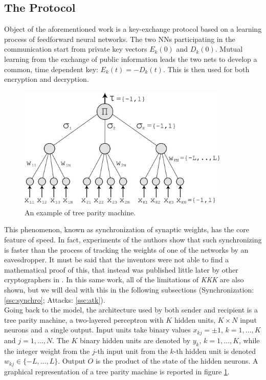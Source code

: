 \documentclass[%
    corpo=11pt,
    twoside,
    stile=classica,
    oldstyle,
    autoretitolo,
    tipotesi=magistrale,
    greek,
    evenboxes,
    english
]{toptesi}
\begin{document}
\subsection{The Protocol}
Object of the aforementioned work is a key-exchange protocol based on a learning process of feedforward neural networks. The two NNs participating in the communication start from private key vectors $E_k(0)$ and $D_k(0)$. Mutual learning from the exchange of public information leads the two nets to develop a common, time dependent key: $E_k(t) = - D_k(t)$. This is then used for both encryption and decryption. \\
\begin{figure}[]
\centering
\includegraphics[width=0.9\textwidth]{pictures/tpm.jpg}
\caption{An example of tree parity machine.}
\label{fig:tpm}
\end{figure}
This phenomenon, known as synchronization of synaptic weights, has the core feature of speed. In fact, experiments of the authors show that such synchronizing is faster than the process of tracking the weights of one of the networks by an eavesdropper. It must be said that the inventors were not able to find a mathematical proof of this, that instead was published little later by other cryptographers in \cite{shamir}. In this same work, all of the limitations of \textit{KKK} are also shown, but we will deal with this in the following subsections (Synchronization: \ref{ssc:synchro}; Attacks: \ref{ssc:atk}).  \\
Going back to the model, the architecture used by both sender and recipient is a tree parity machine, a two-layered perceptron with $K$ hidden units, $K \times N$ input neurons and a single output. Input units take binary values $x_{kj} = \pm 1$, $k = 1,\dots, K$ and $j = 1, \dots, N$. The $K$ binary hidden units are denoted by $y_k$, $k = 1,\dots, K$, while the integer weight from the $j$-th input unit from the $k$-th hidden unit is denoted $w_{kj}\in\{-L,\dots,L\}$. Output $O$ is the product of the state of the hidden neurons. A graphical representation of a tree parity machine is reported in figure \ref{fig:tpm}. \\
\end{document}
